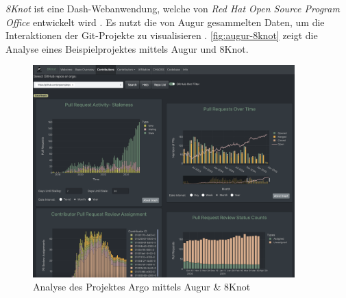 \textit{8Knot} ist eine Dash-Webanwendung, welche von \textit{Red Hat Open Source Program Office} entwickelt wird \parencite{noauthor_measuring_nodate}. Es nutzt die von Augur gesammelten Daten, um die Interaktionen der Git-Projekte zu visualisieren \parencite{noauthor_chaossaugur_nodate} \parencite{noauthor_oss-aspen8knot_2025}. \autoref{fig:augur-8knot} zeigt die Analyse eines Beispielprojektes mittels Augur und 8Knot. 
\begin{figure}[htbp]
    \centering
    \includegraphics[width=0.9\textwidth]{Figures/augur-8knot.png}
    \caption{Analyse des Projektes Argo mittels Augur \& 8Knot \parencite{noauthor_metrixchaossio_nodate} \parencite{noauthor_argoprojargo-workflows_2025}}
    \label{fig:augur-8knot}
\end{figure}

